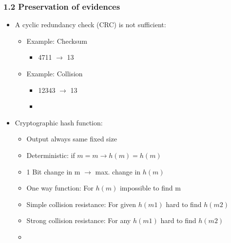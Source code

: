 \begin{frame}
  \frametitle{1.2 Preservation of evidences}
  \begin{itemize}
      \item A cyclic redundancy check (CRC) is not sufficient:
      \begin{itemize}
          \item Example: Checksum
          \begin{itemize}
		  \item[] 4711 $\to$ 13
          \end{itemize}
          \item Example: Collision
          \begin{itemize}
		  \item[] 12343 $\to$ 13
		  \item[] 
          \end{itemize}
      \end{itemize}
      \item Cryptographic hash function:
      \begin{itemize}
          \item Output always same fixed size
	  \item Deterministic: if $m = m \to h(m) = h(m)$
	  \item 1 Bit change in m $\to$ max. change in $h(m)$
	  \item One way function: For $h(m)$ impossible to find m
	  \item Simple collision resistance: For given $h(m1)$ hard to find $h(m2)$
	  \item Strong collision resistance: For any $h(m1)$ hard to find $h(m2)$
	  \item[]
      \end{itemize}
  \end{itemize}
\end{frame}


